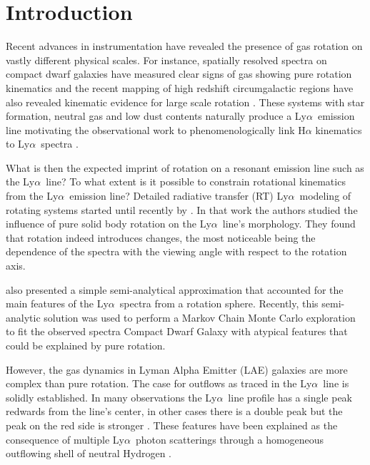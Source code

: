 \documentclass[a4paper,fleqn,usenatbib]{mnras}
\newcommand{\lya}{\ifmmode{{\rm Ly}\alpha}\else Ly$\alpha$\ \fi}
\begin{document}


\section{Introduction}
\label{sec:intro}

Recent advances in instrumentation have revealed the presence of gas
rotation on vastly different physical scales.
For instance, spatially resolved spectra on compact dwarf galaxies
have measured clear signs of gas showing pure rotation kinematics
\citep{2015A&A...577A..21C,2017A&A...600A.125C} and the recent mapping of
high redshift circumgalactic regions have also revealed kinematic
evidence for large scale rotation \citep{2018MNRAS.473.3907A}.
These systems with star formation, neutral gas and low dust
contents naturally produce a \lya emission line \citep{PartridgePeebles}
motivating the observational work to phenomenologically link
H$\alpha$ kinematics to \lya spectra \citep[e.g.][]{Herenz2016}. 


What is then the expected imprint of rotation on a resonant emission
line such as the \lya line? To what extent is it possible to constrain
rotational kinematics from the \lya emission line? 
Detailed radiative transfer (RT) \lya modeling of rotating systems
started until recently by \cite{Garavito14}.
In that work the authors studied the influence of pure solid body
rotation on the \lya line's morphology.
They found that rotation indeed introduces changes, the most
noticeable being the dependence of the spectra with the viewing
angle with respect to the rotation axis. 

\cite{Garavito14} also presented a simple semi-analytical
approximation that accounted for the main features of the \lya spectra
from a rotation sphere.
Recently, this semi-analytic solution was used to perform a Markov
Chain Monte Carlo exploration to fit the observed spectra Compact
Dwarf Galaxy \citep{tololo} with atypical features that could be
explained by pure rotation.  

However, the gas dynamics in Lyman Alpha Emitter (LAE) galaxies are
more complex than pure rotation.
The case for outflows as traced in the \lya line is solidly
established.  
In many observations the \lya line profile has a single peak
redwards from the line's center, in other cases there is a double peak
but the peak on the red side is stronger
\citep[e.g.][]{2010ApJ...717..289S,Erb14,Trainor16}.   
These features have been explained as the consequence of multiple
\lya photon scatterings through a homogeneous outflowing shell of
neutral Hydrogen
\citep{2006A&A...460..397V,Orsi12,2015ApJ...812..123G}.  
\end{document}
